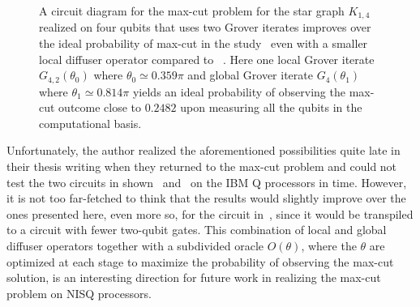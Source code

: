 \begin{figure}[h]
	\centering
	\caption[A circuit diagram for the \acs{max-cut} problem for the star graph $K_{1,4}$ realized on four qubits that uses two Grover iterates improves over the ideal probability of \acs{max-cut} in the study~\cite{Satoh_2020} even with a smaller local diffuser operator compared to ~\protect{}.]{A circuit diagram for the \acs{max-cut} problem for the star graph $K_{1,4}$ realized on four qubits that uses two Grover iterates improves over the ideal probability of \acs{max-cut} in the study~\cite{Satoh_2020} even with a smaller local diffuser operator compared to ~\protect{}. Here one local Grover iterate $G_{4,2}(\theta_0)$ where ${\theta_0 \simeq 0.359\pi}$ and global Grover iterate $G_{4}(\theta_1)$ where ${\theta_1 \simeq 0.814\pi}$ yields an ideal probability of observing the \acs{max-cut} outcome close to $0.2482$ upon measuring all the qubits in the computational basis.}
\end{figure}

\noindent
Unfortunately, the author realized the aforementioned possibilities quite late in their thesis writing when they returned to the \acs{max-cut} problem and could not test the two circuits in shown~ and~ on the IBM Q processors in time. However, it is not too far-fetched to think that the results would slightly improve over the ones presented here, even more so, for the circuit in~, since it would be transpiled to a circuit with fewer two-qubit gates. This combination of local and global diffuser operators together with a subdivided oracle $O(\theta)$, where the $\theta$ are optimized at each stage to maximize the probability of observing the \acs{max-cut} solution, is an interesting direction for future work in realizing the \acs{max-cut} problem on \acs{NISQ} processors. 



